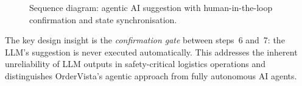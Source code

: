 \begin{figure}[ht]
{}%
  \caption{Sequence diagram: agentic AI suggestion with human-in-the-loop
           confirmation and state synchronisation.}
  \label{fig:seq-agentic}
\end{figure}

The key design insight is the \emph{confirmation gate} between steps~6 and~7:
the LLM's suggestion is never executed automatically.  This addresses the
inherent unreliability of LLM outputs in safety-critical logistics operations
\autocite{ji2024hallucination} and distinguishes OrderVista's agentic approach
from fully autonomous AI agents.
